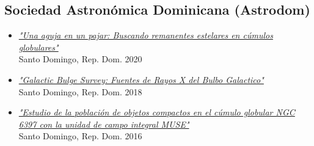 \documentclass[letterpaper,10pt]{article}
\begin{document}
\subsection*{Sociedad Astron\'omica Dominicana (Astrodom)}

\begin{itemize}[label=$\blacktriangleright$]


    \item \textit{\href{https://manuelpm.me/AstrodomJulio2020/}{"Una aguja en un pajar: Buscando remanentes estelares en c\'umulos globulares"}} \\ Santo Domingo, Rep. Dom. 2020


	\item \textit{\href{http://manuelpm.me/AstrodomGBStalk/}{"Galactic Bulge Survey: Fuentes de Rayos X del Bulbo Galactico"}} \\ Santo Domingo, Rep. Dom. 2018



	\item \textit{\href{http://manuelpm.me/Astrodomtalk/}{"Estudio de la poblaci\'on de objetos compactos en el c\'umulo globular NGC 6397 con la unidad de campo integral MUSE"}} \\Santo Domingo, Rep. Dom. 2016

\end{itemize}






%
%
\end{document}
